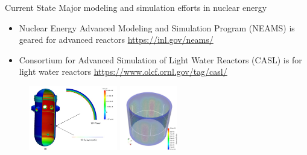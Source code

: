 \documentclass[xcolor=x11names,compress, handout]{beamer}
\renewcommand{\(}{\begin{columns}}
\renewcommand{\)}{\end{columns}}
\newcommand{\<}[1]{\begin{column}{#1}}
\renewcommand{\>}{\end{column}}
\begin{document}
\begin{frame}{Current State}
Major modeling and simulation efforts in nuclear energy
\begin{itemize}
\item Nuclear Energy Advanced Modeling and Simulation Program (NEAMS) is geared for advanced reactors \url{https://inl.gov/neams/}
\item Consortium for Advanced Simulation of Light Water Reactors (CASL) is for light water reactors \url{https://www.olcf.ornl.gov/tag/casl/}
\end{itemize}
\begin{figure}
\includegraphics[height=1.1in,clip]{../figs/GrizzlyNEAMS}
\hspace*{3 em}
\includegraphics[height=1.1in,clip]{../figs/Grizzly2NEAMS}
\end{figure}

\end{frame}
\end{document}
